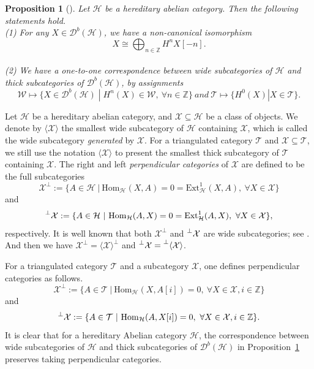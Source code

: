 \documentclass[a4paper, 11pt, reqno]{amsart}
\numberwithin{equation}{section}
\newtheorem{prop}[thm]{Proposition}
\theoremstyle{remark}
\theoremstyle{definition}
\begin{document}
\begin{prop} [{\cite[Theorem~5.1]{bruning2007thick}}] \label{bruning}
   Let $\mathcal H$ be a hereditary abelian category. Then the following statements hold.\\
   (1) For any $X \in \mathcal D^b(\mathcal H)$, we have a non-canonical isomorphism
   \[
   X \cong \bigoplus_{n \in \mathbb Z}H^nX[-n].
   \] \\
   (2) We have a one-to-one correspondence between wide subcategories of $\mathcal H$ and thick subcategories of $\mathcal D^b(\mathcal H)$, by assignments
   \[
   \mathcal W \mapsto \{X \in \mathcal D^b(\mathcal H) \; | \; H^n(X) \in \mathcal W, \ \forall n \in \mathbb Z \} \ and \  \mathcal T \mapsto \{ H^0(X) | X \in \mathcal T \}.
   \]
   \end{prop}

Let $\mathcal H$ be a hereditary abelian category, and $\mathcal X \subseteq \mathcal H$ be a class of objects. We denote by $\langle \mathcal X \rangle$ the smallest wide subcategory of $\mathcal H$ containing $\mathcal X$, which is called the wide subcategory \emph{generated} by $\mathcal X$. For a triangulated category $\mathcal T$ and $\mathcal X \subseteq \mathcal T$, we still use the notation $\langle \mathcal X \rangle$ to present the smallest thick subcategory of $\mathcal T$ containing $\mathcal X$. The right and left \emph{perpendicular categories} of $\mathcal X$ are defined to be the full subcategories
\[
\mathcal X^{\perp} :=\{A \in \mathcal H \ | \ \mathrm{Hom}_{\mathcal H}(X,A)=0=\mathrm{Ext}_{\mathcal H}^1(X,A), \ \forall X \in \mathcal X \}
\]
and
\[
\prescript{\perp}{}{\mathcal X} :=\{A \in \mathcal H \ | \ \mathrm{Hom}_{\mathcal H}(A,X)=0=\mathrm{Ext}_{\mathcal H}^1(A,X), \ \forall X \in \mathcal X \},
\]
respectively. It is well known that both $\mathcal X^{\perp}$ and $\prescript{\perp}{}{\mathcal X}$ are wide subcategories; see \cite[Proposition~1.1]{Werner1991Perpendicular}. And then we have $\mathcal X^{\perp}=\langle \mathcal X \rangle^{\perp}$ and $\prescript{\perp}{}{\mathcal X}=\prescript{\perp}{}{\langle \mathcal X \rangle}$.

For a triangulated category $\mathcal T$ and a subcategory $\mathcal X$, one defines perpendicular categories as follows.
\[
\mathcal X^{\perp} :=\{A \in \mathcal T \ | \ \mathrm{Hom}_{\mathcal H}(X,A[i])=0, \ \forall X \in \mathcal X, i\in \mathbb Z \}
\]
and
\[
\prescript{\perp}{}{\mathcal X} :=\{A \in \mathcal T \ | \ \mathrm{Hom}_{\mathcal H}(A,X[i])=0, \ \forall X \in \mathcal X, i \in \mathbb Z \}.
\]
It is clear that for a hereditary Abelian category $\mathcal H$, the correspondence between wide subcategories of $\mathcal H$ and thick subcategories of $\mathcal D^b(\mathcal H)$ in Proposition~\ref{bruning} preserves taking perpendicular categories.
\end{document}

